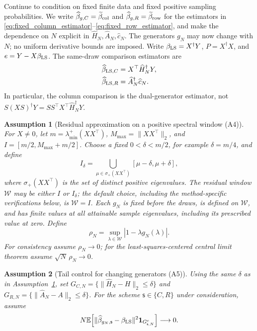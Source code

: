 \documentclass[pdflatex,iicol,sn-mathphys-ay]{sn-jnl}
\theoremstyle{thmstyleone}
\theoremstyle{thmstylethree}
\newtheorem{assumption}{Assumption}
\theoremstyle{thmstyletwo}
\newcommand{\E}{\mathbb E}
\newcommand{\norm}[1]{\lVert#1\rVert}
\begin{document}
Continue to condition on fixed finite data and fixed positive sampling probabilities.
We write $\widehat\beta_{g,C}=\widetilde\beta_{\rm col}$ and
$\widehat\beta_{g,R}=\widetilde\beta_{\rm row}$ for the estimators in
\eqref{eq:fixed_column_estimator}--\eqref{eq:fixed_row_estimator}, and make
the dependence on $N$ explicit in $\widehat H_N,\widehat A_N,\widehat c_N$.
The generators $g_N$ may now change with $N$; no uniform derivative bounds are imposed.
Write $\beta_{\rm LS}=X^\dagger Y$, $P=X^\dagger X$, and
$e=Y-X\beta_{\rm LS}$. The same-draw comparison estimators are
\begin{equation*}
 \begin{aligned}
 \widehat\beta_{{\rm LS},C}&=X^\top\widehat H_N^\dagger Y,\\
 \widehat\beta_{{\rm LS},R}&=\widehat A_N^\dagger\widehat c_N.
 \end{aligned}
\end{equation*}
In particular, the column comparison is the dual-generator estimator, not
$S(XS)^\dagger Y=SS^\top X^\top\widehat H_N^\dagger Y$.

\begin{assumption}[Residual approximation on a positive spectral window (A4)]
\label{ass:residual_window}
For $X\ne0$, let $m=\lambda_{\min}^+(XX^\top)$,
$M_{\max}=\norm{XX^\top}_2$, and $I=[m/2,M_{\max}+m/2]$.
Choose a fixed $0<\delta<m/2$, for example $\delta=m/4$, and define
\[
 I_\delta=\bigcup_{\mu\in\sigma_+(XX^\top)}[\mu-\delta,\mu+\delta],
\]
where $\sigma_+(XX^\top)$ is the set of distinct positive eigenvalues.
The residual window $\mathcal W$ may be either $I$ or $I_\delta$;
the default choice, including the method-specific verifications below,
is $\mathcal W=I$.
Each $g_N$ is fixed before the draws, is defined on $\mathcal W$, and has
finite values at all attainable sample eigenvalues, including its
prescribed value at zero. Define
\[
 \rho_N=\sup_{\lambda\in\mathcal W}|1-\lambda g_N(\lambda)|.
\]
For consistency assume $\rho_N\to0$; for the least-squares-centered central
limit theorem assume $\sqrt N\,\rho_N\to0$.
\end{assumption}

\begin{assumption}[Tail control for changing generators (A5)]
\label{ass:ls_tail}
Using the same $\delta$ as in Assumption~\ref{ass:residual_window}, set
$G_{C,N}=\{\norm{\widehat H_N-H}_2\le\delta\}$ and
$G_{R,N}=\{\norm{\widehat A_N-A}_2\le\delta\}$.
For the scheme $\mathsf{s}\in\{C,R\}$ under consideration, assume
\begin{equation}\label{eq:ls_tail}
 N\E\!\left[\norm{\widehat\beta_{g_N,\mathsf{s}}-\beta_{\rm LS}}^2
                  \mathbf{1}_{G_{\mathsf{s},N}^c}\right]\longrightarrow0.
\end{equation}
\end{assumption}
\end{document}

